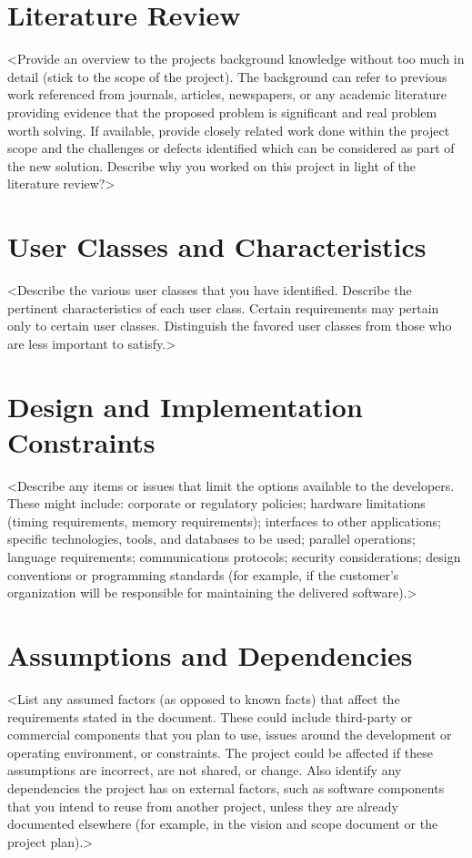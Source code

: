 \section{Literature Review}
<Provide an overview to the projects background knowledge without too much in detail (stick to the scope of the project). The background can refer to previous work referenced from journals, articles, newspapers, or any academic literature providing evidence that  the proposed problem is significant and real problem worth solving. If available, provide closely related work done within the project scope and the challenges or defects identified which can be considered as part of the new solution. Describe why you worked on this project in light of the literature review?>

\section{User Classes and Characteristics}
<Describe the various user classes that you have identified. Describe the pertinent characteristics of each user class. Certain requirements may pertain only to certain user classes. Distinguish the favored user classes from those who are less important to satisfy.>

\section{Design and Implementation Constraints}
<Describe any items or issues that limit the options available to the developers. These might include: corporate or regulatory policies; hardware limitations (timing requirements, memory requirements); interfaces to other applications; specific technologies, tools, and databases to be used; parallel operations; language requirements; communications protocols; security considerations; design conventions or programming standards (for example, if the customer’s organization will be responsible for maintaining the delivered software).>

\section{Assumptions and Dependencies}
<List any assumed factors (as opposed to known facts) that affect the requirements stated in the document. These could include third-party or commercial components that you plan to use, issues around the development or operating environment, or constraints. The project could be affected if these assumptions are incorrect, are not shared, or change. Also identify any dependencies the project has on external factors, such as software components that you intend to reuse from another project, unless they are already documented elsewhere (for example, in the vision and scope document or the project plan).>

